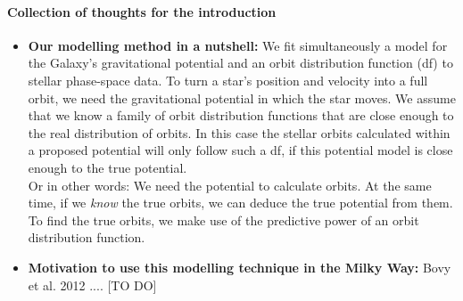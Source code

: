 \documentclass[12pt,preprint]{aastex}
\begin{document}
\paragraph{Collection of thoughts for the introduction}
\begin{itemize}
\item \textbf{Our modelling method in a nutshell:} We fit simultaneously a model for the Galaxy's gravitational potential and an orbit distribution function (df) to stellar phase-space data. To turn a star's position and velocity into a full orbit, we need the gravitational potential in which the star moves. We assume that we know a family of orbit distribution functions that are close enough to the real distribution of orbits. In this case the stellar orbits calculated within a proposed potential will only follow such a df, if this potential model is close enough to the true potential.
\\Or in other words: We need the potential to calculate orbits. At the same time, if we \textit{know} the true orbits, we can deduce the true potential from them. To find the true orbits, we make use of the predictive power of an orbit distribution function.

\item \textbf{Motivation to use this modelling technique in the Milky Way:} Bovy et al. 2012 .... [TO DO]


\end{itemize}
\end{document}

